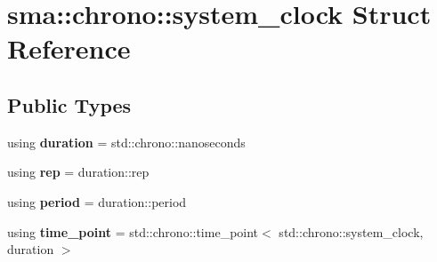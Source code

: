 \hypertarget{structsma_1_1chrono_1_1system__clock}{\section{sma\-:\-:chrono\-:\-:system\-\_\-clock Struct Reference}
\label{structsma_1_1chrono_1_1system__clock}
}
\subsection*{Public Types}
\begin{DoxyCompactItemize}
\item 
\hypertarget{structsma_1_1chrono_1_1system__clock_a50cdcc4f8c861479233e4038bb8414ff}{using {\bfseries duration} = std\-::chrono\-::nanoseconds}\label{structsma_1_1chrono_1_1system__clock_a50cdcc4f8c861479233e4038bb8414ff}

\item 
\hypertarget{structsma_1_1chrono_1_1system__clock_a3b4d5df6753dc723a51a1bc6f5726a91}{using {\bfseries rep} = duration\-::rep}\label{structsma_1_1chrono_1_1system__clock_a3b4d5df6753dc723a51a1bc6f5726a91}

\item 
\hypertarget{structsma_1_1chrono_1_1system__clock_a67000784ec86890fb8c90f32ec6d7732}{using {\bfseries period} = duration\-::period}\label{structsma_1_1chrono_1_1system__clock_a67000784ec86890fb8c90f32ec6d7732}

\item 
\hypertarget{structsma_1_1chrono_1_1system__clock_a1834f367e76574fa8cca598993382b2b}{using {\bfseries time\-\_\-point} = std\-::chrono\-::time\-\_\-point$<$ std\-::chrono\-::system\-\_\-clock, duration $>$}\label{structsma_1_1chrono_1_1system__clock_a1834f367e76574fa8cca598993382b2b}

\end{DoxyCompactItemize}
